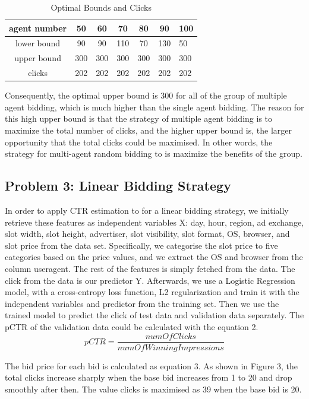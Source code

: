 \documentclass{sig-alternate-05-2015}
\begin{document}
\begin{table}
\centering
\caption{Optimal Bounds and Clicks}
\begin{tabular}{|c|c|c|c|c|c|l|} \hline
agent number&50&60&70&80&90&100\\ \hline
lower bound&90&90&110&70&130&50\\ \hline
upper bound&300&300&300&300&300&300\\ \hline
clicks&202& 202&202&202&202&202\\
\hline\end{tabular}
\end{table}

Consequently, the optimal upper bound is 300 for all of the group of multiple agent bidding, which is much higher than the single agent bidding. The reason for this high upper bound is that the strategy of multiple agent bidding is to maximize the total number of clicks, and the higher upper bound is, the larger opportunity that the total clicks could be maximised. In other words, the strategy for multi-agent random bidding to is maximize the benefits of the group.

\subsection{Problem 3: Linear Bidding Strategy}
In order to apply CTR estimation to for a linear bidding strategy, we initially retrieve these features as independent variables X: day, hour, region, ad exchange, slot width, slot height, advertiser, slot visibility, slot format, OS, browser, and slot price from the data set. Specifically, we categorise the slot price to five categories based on the price values, and we extract the OS and browser from the column useragent. The rest of the features is simply fetched from the data. The click from the data is our predictor Y.
Afterwards, we use a Logistic Regression model, with a cross-entropy loss function, L2 regularization and train it with the independent variables and predictor from the training set. Then we use the trained model to predict the click of test data and validation data separately. The pCTR of the validation data could be calculated with the equation 2.
\begin{equation}pCTR=\frac{numOfClicks}{numOfWinningImpressions}\end{equation}

The bid price for each bid is calculated as equation 3. As shown in Figure 3, the total clicks increase sharply when the base bid increases from 1 to 20 and drop smoothly after then. The value clicks is maximised as 39 when the base bid is 20.
\end{document}
